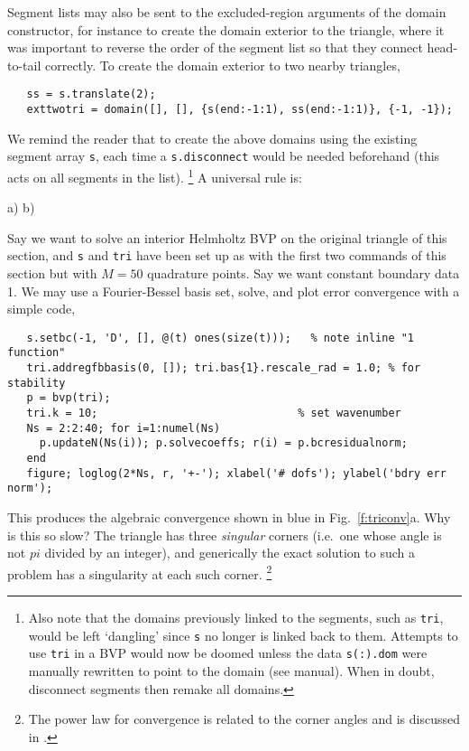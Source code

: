 Segment lists may also be sent to the excluded-region arguments of the
domain constructor, for instance to create the domain exterior
to the triangle,
where it was important to reverse the order of the segment list
so that they connect head-to-tail correctly.
To create the domain exterior to two nearby triangles,
\begin{verbatim}
   ss = s.translate(2);
   exttwotri = domain([], [], {s(end:-1:1), ss(end:-1:1)}, {-1, -1});
\end{verbatim}
We remind the reader that to create the above domains
using the existing segment array {\tt s}, each time a {\tt s.disconnect}
would be needed beforehand (this acts on all segments in the list).%
  \footnote{Also note that the domains previously linked to the segments, such
    as {\tt tri}, would be left `dangling' since {\tt s} no longer is linked
    back to them. Attempts to use {\tt tri} in a BVP would now be doomed
    unless the data {\tt s(:).dom} were manually rewritten to point to
    the domain (see manual). When in doubt, disconnect segments then remake
    all domains.}
A universal rule is:
\begin{center}\end{center}

\bfi %
a)
b)
\efi

Say we want to solve an interior Helmholtz BVP on the original triangle
of this section, and {\tt s} and {\tt tri} have been set up as with the
first two commands of this section but with $M=50$ quadrature points.
Say we want constant boundary data 1.
We may use a Fourier-Bessel basis set, solve, and
plot error convergence with a simple code,
\begin{verbatim}
   s.setbc(-1, 'D', [], @(t) ones(size(t)));   % note inline "1 function"
   tri.addregfbbasis(0, []); tri.bas{1}.rescale_rad = 1.0; % for stability
   p = bvp(tri);
   tri.k = 10;                               % set wavenumber
   Ns = 2:2:40; for i=1:numel(Ns)
     p.updateN(Ns(i)); p.solvecoeffs; r(i) = p.bcresidualnorm;
   end
   figure; loglog(2*Ns, r, '+-'); xlabel('# dofs'); ylabel('bdry err norm');
\end{verbatim}
This produces the algebraic convergence
shown in blue in Fig.~\ref{f:triconv}a.
Why is this so slow? The triangle has three {\em singular} corners
(i.e.\ one whose angle is not $pi$ divided by an integer), and
generically the exact solution to
such a problem has a singularity at each such corner.%
  \footnote{The power law for convergence is related to the corner
    angles and is discussed in \cite{Ei74}.}


